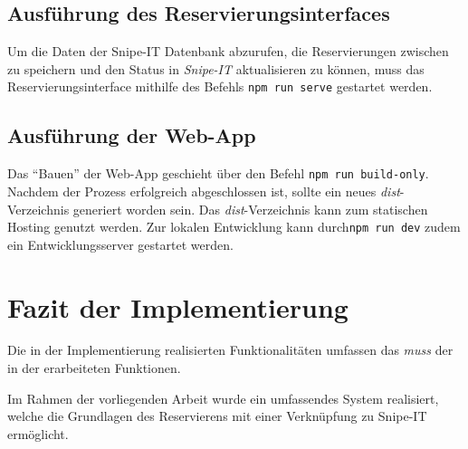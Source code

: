 \subsection{Ausführung des Reservierungsinterfaces}
Um die Daten der Snipe-IT Datenbank abzurufen, die Reservierungen zwischen zu speichern und den
Status in \textit{Snipe-IT} aktualisieren zu können, muss das Reservierungsinterface mithilfe des
Befehls \lstinline{npm run serve} gestartet werden.


\subsection{Ausführung der Web-App}
Das \enquote{Bauen} der Web-App geschieht über den Befehl \lstinline{npm run build-only}. Nachdem
der Prozess erfolgreich abgeschlossen ist, sollte ein neues \textit{dist}-Verzeichnis generiert
worden sein. Das \textit{dist}-Verzeichnis kann zum statischen Hosting genutzt werden. Zur lokalen
Entwicklung kann durch\lstinline{npm run dev} zudem ein Entwicklungsserver gestartet werden.

\section{Fazit der Implementierung}

Die in der Implementierung realisierten Funktionalitäten umfassen das \textit{muss} der in der
 erarbeiteten Funktionen.

Im Rahmen der vorliegenden Arbeit wurde ein umfassendes System realisiert, welche die Grundlagen des
Reservierens mit einer Verknüpfung zu Snipe-IT ermöglicht. 
